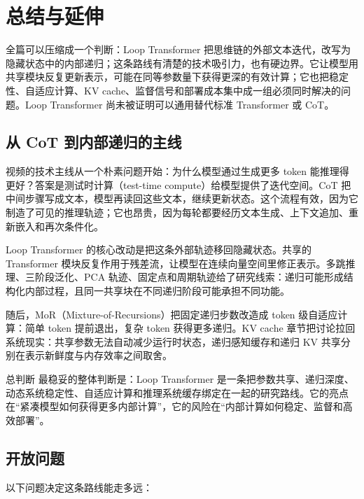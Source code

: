 ﻿\documentclass[a4paper]{article}
\begin{document}

\section{总结与延伸}
\label{sec:synthesis}

全篇可以压缩成一个判断：Loop Transformer 把思维链的外部文本迭代，改写为隐藏状态中的内部递归；这条路线有清楚的技术吸引力，也有硬边界。它让模型用共享模块反复更新表示，可能在同等参数量下获得更深的有效计算；它也把稳定性、自适应计算、KV cache、监督信号和部署成本集中成一组必须同时解决的问题。Loop Transformer 尚未被证明可以通用替代标准 Transformer 或 CoT。

\subsection{从 CoT 到内部递归的主线}

视频的技术主线从一个朴素问题开始：为什么模型通过生成更多 token 能推理得更好？答案是测试时计算（test-time compute）给模型提供了迭代空间。CoT 把中间步骤写成文本，模型再读回这些文本，继续更新状态。这个流程有效，因为它制造了可见的推理轨迹；它也昂贵，因为每轮都要经历文本生成、上下文追加、重新嵌入和再次条件化。

Loop Transformer 的核心改动是把这条外部轨迹移回隐藏状态。共享的 Transformer 模块反复作用于残差流，让模型在连续向量空间里修正表示。多跳推理、三阶段泛化、PCA 轨迹、固定点和周期轨迹给了研究线索：递归可能形成结构化内部过程，且同一共享块在不同递归阶段可能承担不同功能。

随后，MoR（Mixture-of-Recursions）把固定递归步数改造成 token 级自适应计算：简单 token 提前退出，复杂 token 获得更多递归。KV cache 章节把讨论拉回系统现实：共享参数无法自动减少运行时状态，递归感知缓存和递归 KV 共享分别在表示新鲜度与内存效率之间取舍。

\begin{importantbox}{总判断}
最稳妥的整体判断是：Loop Transformer 是一条把参数共享、递归深度、动态系统稳定性、自适应计算和推理系统缓存绑定在一起的研究路线。它的亮点在“紧凑模型如何获得更多内部计算”，它的风险在“内部计算如何稳定、监督和高效部署”。
\end{importantbox}

\subsection{开放问题}

以下问题决定这条路线能走多远：
\end{document}

